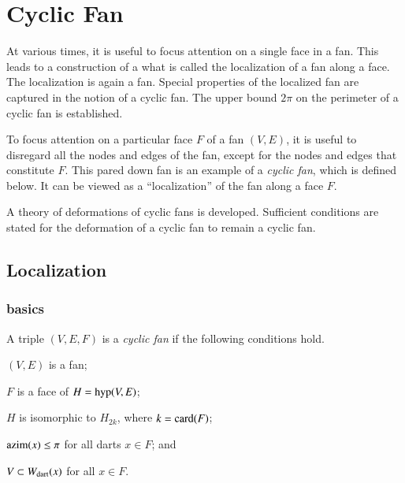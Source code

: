 %

\chapter{Cyclic Fan}\label{sec:cyclic}


\begin{summary}
At various times, it is useful to focus attention on a single face in a fan.  This leads to a construction of a what is called the localization of a fan along a face.  The localization is again a fan.  Special properties of the localized fan are captured in the notion of a cyclic fan.  The upper bound $2\pi$ on the perimeter of a cyclic fan is established.


To focus attention on a particular face $F$ of a fan $(V,E)$, it is useful to disregard all the nodes
and edges of the fan, except for the nodes and edges that constitute $F$.  This pared down fan
is an example of a {\it cyclic fan}, which is defined below.  It can be viewed as a ``localization'' of
the fan along a face $F$.  

A theory of deformations of cyclic fans is developed.  Sufficient conditions are stated for the deformation of a cyclic fan to remain a cyclic fan.
\end{summary}


\section{Localization}


\subsection{basics}


\begin{definition}  A triple $(V,E,F)$ is a {\it cyclic fan} if the following conditions hold.
\begin{nomerate} 
\item {} $(V,E)$ is a fan;
\item {} $F$ is a face of $H = {\operatorname{hyp}}(V,E)$;
\item {} $H$ is isomorphic to $H_{2k}$, where $k = {\operatorname{card}}(F)$;
\item {} ${\operatorname{azim}}(x)\le \pi$ for all darts $x\in F$; and
\item {} $V\subset W_{\text{dart}}(x)$ for all $x\in F$.
\end{nomerate}
\end{definition}
%

